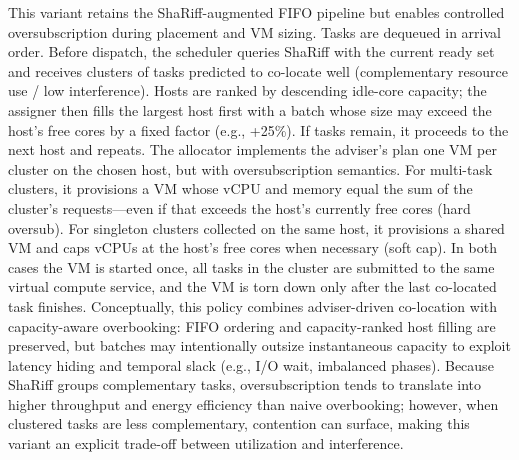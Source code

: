 This variant retains the ShaRiff-augmented FIFO pipeline but enables controlled oversubscription during placement and VM sizing. Tasks are dequeued in arrival order. Before dispatch, the scheduler queries ShaRiff with the current ready set and receives clusters of tasks predicted to co-locate well (complementary resource use / low interference). Hosts are ranked by descending idle-core capacity; the assigner then fills the largest host first with a batch whose size may exceed the host’s free cores by a fixed factor (e.g., +25\%). If tasks remain, it proceeds to the next host and repeats.
The allocator implements the adviser’s plan one VM per cluster on the chosen host, but with oversubscription semantics. For multi-task clusters, it provisions a VM whose vCPU and memory equal the sum of the cluster’s requests—even if that exceeds the host’s currently free cores (hard oversub). For singleton clusters collected on the same host, it provisions a shared VM and caps vCPUs at the host’s free cores when necessary (soft cap). In both cases the VM is started once, all tasks in the cluster are submitted to the same virtual compute service, and the VM is torn down only after the last co-located task finishes.
Conceptually, this policy combines adviser-driven co-location with capacity-aware overbooking: FIFO ordering and capacity-ranked host filling are preserved, but batches may intentionally outsize instantaneous capacity to exploit latency hiding and temporal slack (e.g., I/O wait, imbalanced phases). Because ShaRiff groups complementary tasks, oversubscription tends to translate into higher throughput and energy efficiency than naive overbooking; however, when clustered tasks are less complementary, contention can surface, making this variant an explicit trade-off between utilization and interference.



